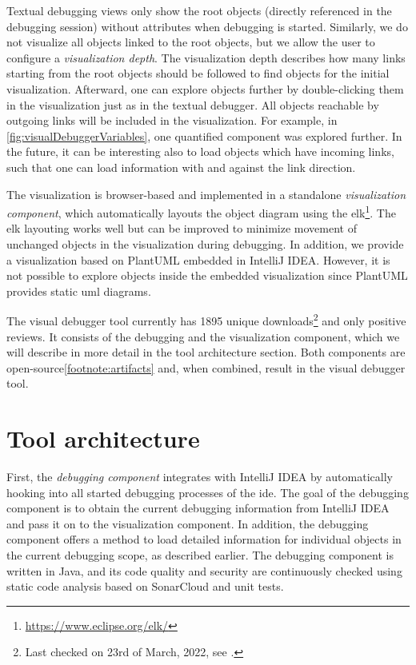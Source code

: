 \documentclass[conference]{IEEEtran}
\newcommand{\intellij}{IntelliJ IDEA}
\begin{document}
Textual debugging views only show the root objects (directly referenced in the debugging session) without attributes when debugging is started.
Similarly, we do not visualize all objects linked to the root objects, but we allow the user to configure a \textit{visualization depth}.
The visualization depth describes how many links starting from the root objects should be followed to find objects for the initial visualization.
Afterward, one can explore objects further by double-clicking them in the visualization just as in the textual debugger.
All objects reachable by outgoing links will be included in the visualization.
For example, in \cref{fig:visualDebuggerVariables}, one quantified component was explored further.
In the future, it can be interesting also to load objects which have incoming links, such that one can load information with and against the link direction.

The visualization is browser-based and implemented in a standalone \textit{visualization component}, which automatically layouts the object diagram using the \gls*{elk}\footnote{\url{https://www.eclipse.org/elk/}}.
The \gls*{elk} layouting works well but can be improved to minimize movement of unchanged objects in the visualization during debugging.
In addition, we provide a visualization based on PlantUML embedded in \intellij{}.
However, it is not possible to explore objects inside the embedded visualization since PlantUML provides static \gls*{uml} diagrams.

The visual debugger tool currently has 1895 unique downloads\footnote{\label{footnote:pluginStats}Last checked on 23rd of March, 2022, see \cite{VisualDebuggerIntelliJ}.} and only positive reviews.
It consists of the debugging and the visualization component, which we will describe in more detail in the tool architecture section.
Both components are open-source\cref{footnote:artifacts} and, when combined, result in the visual debugger tool.

\section{Tool architecture}  \label{sec:architecture}
First, the \textit{debugging component} integrates with \intellij{} by automatically hooking into all started debugging processes of the \gls*{ide}.
The goal of the debugging component is to obtain the current debugging information from \intellij{} and pass it on to the visualization component.
In addition, the debugging component offers a method to load detailed information for individual objects in the current debugging scope, as described earlier.
The debugging component is written in Java, and its code quality and security are continuously checked using static code analysis based on SonarCloud and unit tests.
\end{document}
